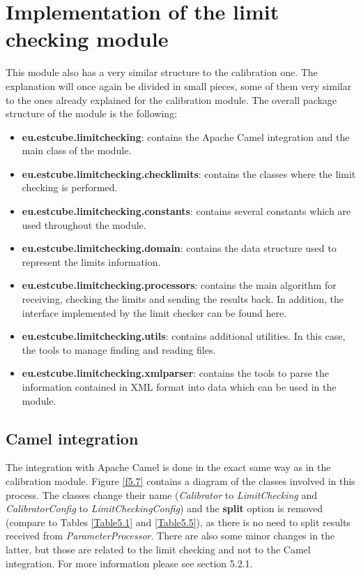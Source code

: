 \section{Implementation of the limit checking module}

This module also has a very similar structure to the calibration one. The explanation will once again be divided in small pieces, some of them very similar to the ones already explained for the calibration module. The overall package structure of the module is the following:

\begin{itemize}
\item \textbf{eu.estcube.limitchecking}: contains the Apache Camel integration and the main class of the module.
\item \textbf{eu.estcube.limitchecking.checklimits}: contains the classes where the limit checking is performed.
\item \textbf{eu.estcube.limitchecking.constants}: contains several constants which are used throughout the module.
\item \textbf{eu.estcube.limitchecking.domain}: contains the data structure used to represent the limits information.
\item \textbf{eu.estcube.limitchecking.processors}: contains the main algorithm for receiving, checking the limits and sending the results back. In addition, the interface implemented by the limit checker can be found here.
\item \textbf{eu.estcube.limitchecking.utils}: contains additional utilities. In this case, the tools to manage finding and reading files.
\item \textbf{eu.estcube.limitchecking.xmlparser}: contains the tools to parse the information contained in XML format into data which can be used in the module.
\end{itemize}
\subsection{Camel integration}

The integration with Apache Camel is done in the exact same way as in the calibration module. Figure \ref{f5.7} contains a diagram of the classes involved in this process. The classes change their name (\emph{Calibrator} to \emph{LimitChecking} and \emph{CalibratorConfig} to \emph{LimitCheckingConfig}) and the \textbf{split} option is removed (compare to Tables \ref{Table5.1} and \ref{Table5.5}), as there is no need to split results received from \emph{ParameterProcessor}. There are also some minor changes in the latter, but those are related to the limit checking and not to the Camel integration. For more information please see section 5.2.1.

